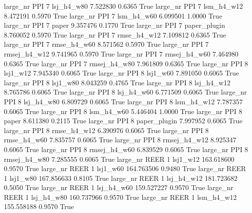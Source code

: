   large_nr      PPI                 7   lsj_h4_w80    7.522830      0.6365    True
  large_nr      PPI                 7   lsm_h4_w12    8.472191      0.5970    True
  large_nr      PPI                 7   lsm_h4_w60    6.099501      1.0000    True
  large_nr      PPI                 7        paper    9.357476      0.1770    True
  large_nr      PPI                 7 paper_plugin    8.760052      0.5970    True
  large_nr      PPI                 7  rmse_h4_w12    7.109812      0.6365    True
  large_nr      PPI                 7  rmse_h4_w60    8.571562      0.5970    True
  large_nr      PPI                 7 rmsej_h4_w12    9.741965      0.5970    True
  large_nr      PPI                 7 rmsej_h4_w60    7.464980      0.6365    True
  large_nr      PPI                 7 rmsej_h4_w80    7.961809      0.6365    True
  large_nr      PPI                 8     lsj1_w12    7.945340      0.6065    True
  large_nr      PPI                 8     lsj1_w60    7.891050      0.6065    True
  large_nr      PPI                 8     lsj1_w80    8.043259      0.4765    True
  large_nr      PPI                 8   lsj_h4_w12    8.765786      0.6065    True
  large_nr      PPI                 8   lsj_h4_w60    6.771509      0.6065    True
  large_nr      PPI                 8   lsj_h4_w80    6.809729      0.6065    True
  large_nr      PPI                 8   lsm_h4_w12    7.787357      0.6065    True
  large_nr      PPI                 8   lsm_h4_w60    5.446404      1.0000    True
  large_nr      PPI                 8        paper    8.611380      0.2115    True
  large_nr      PPI                 8 paper_plugin    7.997952      0.6065    True
  large_nr      PPI                 8  rmse_h4_w12    6.390976      0.6065    True
  large_nr      PPI                 8  rmse_h4_w60    7.835757      0.6065    True
  large_nr      PPI                 8 rmsej_h4_w12    8.925347      0.6065    True
  large_nr      PPI                 8 rmsej_h4_w60    6.839529      0.6065    True
  large_nr      PPI                 8 rmsej_h4_w80    7.285555      0.6065    True
  large_nr     REER                 1     lsj1_w12  163.618600      0.9570    True
  large_nr     REER                 1     lsj1_w60  164.763506      0.9480    True
  large_nr     REER                 1     lsj1_w80  167.856633      0.8105    True
  large_nr     REER                 1   lsj_h4_w12  181.723682      0.5050    True
  large_nr     REER                 1   lsj_h4_w60  159.527227      0.9570    True
  large_nr     REER                 1   lsj_h4_w80  160.737966      0.9570    True
  large_nr     REER                 1   lsm_h4_w12  155.558188      0.9570    True
